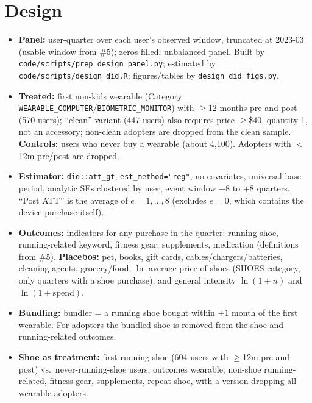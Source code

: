 \documentclass[11pt]{article}
\begin{document}
\section{Design}
\begin{itemize}[nosep]
\item \textbf{Panel:} user-quarter over each user's observed window, truncated at 2023-03 (usable window from \#5); zeros filled; unbalanced panel. Built by \texttt{code/scripts/prep\_design\_panel.py}; estimated by \texttt{code/scripts/design\_did.R}; figures/tables by \texttt{design\_did\_figs.py}.
\item \textbf{Treated:} first non-kids wearable (Category \texttt{WEARABLE\_COMPUTER}/\texttt{BIOMETRIC\_MONITOR}) with $\geq$12 months pre and post (570 users); ``clean'' variant (447 users) also requires price $\geq$\$40, quantity 1, not an accessory; non-clean adopters are dropped from the clean sample. \textbf{Controls:} users who never buy a wearable (about 4{,}100). Adopters with $<$12m pre/post are dropped.
\item \textbf{Estimator:} \texttt{did::att\_gt}, \texttt{est\_method="reg"}, no covariates, universal base period, analytic SEs clustered by user, event window $-8$ to $+8$ quarters. ``Post ATT'' is the average of $e=1,\dots,8$ (excludes $e=0$, which contains the device purchase itself).
\item \textbf{Outcomes:} indicators for any purchase in the quarter: running shoe, running-related keyword, fitness gear, supplements, medication (definitions from \#5). \textbf{Placebos:} pet, books, gift cards, cables/chargers/batteries, cleaning agents, grocery/food; $\ln$ average price of shoes (SHOES category, only quarters with a shoe purchase); and general intensity $\ln(1+n)$ and $\ln(1+\mathrm{spend})$.
\item \textbf{Bundling:} bundler = a running shoe bought within $\pm1$ month of the first wearable. For adopters the bundled shoe is removed from the shoe and running-related outcomes.
\item \textbf{Shoe as treatment:} first running shoe (604 users with $\geq$12m pre and post) vs.\ never-running-shoe users, outcomes wearable, non-shoe running-related, fitness gear, supplements, repeat shoe, with a version dropping all wearable adopters.
\end{itemize}
\end{document}
